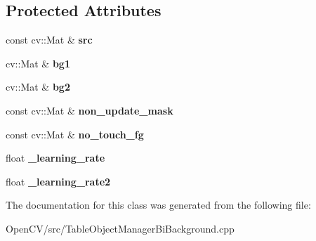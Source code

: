 \subsection*{Protected Attributes}
\begin{DoxyCompactItemize}
\item 
\hypertarget{classbg__update__parallel_ae1c3e97ab55c49abeeb39e6db59e9c85}{}\label{classbg__update__parallel_ae1c3e97ab55c49abeeb39e6db59e9c85} 
const cv\+::\+Mat \& {\bfseries src}
\item 
\hypertarget{classbg__update__parallel_af1160d47a07171184c8d0fe00b9e17b3}{}\label{classbg__update__parallel_af1160d47a07171184c8d0fe00b9e17b3} 
cv\+::\+Mat \& {\bfseries bg1}
\item 
\hypertarget{classbg__update__parallel_a595c319c1e73500138446fa658f1ea3e}{}\label{classbg__update__parallel_a595c319c1e73500138446fa658f1ea3e} 
cv\+::\+Mat \& {\bfseries bg2}
\item 
\hypertarget{classbg__update__parallel_a09df8634dd493bf9c2b6dc6d0e8059d5}{}\label{classbg__update__parallel_a09df8634dd493bf9c2b6dc6d0e8059d5} 
const cv\+::\+Mat \& {\bfseries non\+\_\+update\+\_\+mask}
\item 
\hypertarget{classbg__update__parallel_a87a1f23081a7686dfac2cf93d1f51dd4}{}\label{classbg__update__parallel_a87a1f23081a7686dfac2cf93d1f51dd4} 
const cv\+::\+Mat \& {\bfseries no\+\_\+touch\+\_\+fg}
\item 
\hypertarget{classbg__update__parallel_a476b5920c0c278c10c04672a152ca9a4}{}\label{classbg__update__parallel_a476b5920c0c278c10c04672a152ca9a4} 
float {\bfseries \+\_\+learning\+\_\+rate}
\item 
\hypertarget{classbg__update__parallel_a14e2818a8876a20b7036f2c1ffa908bf}{}\label{classbg__update__parallel_a14e2818a8876a20b7036f2c1ffa908bf} 
float {\bfseries \+\_\+learning\+\_\+rate2}
\end{DoxyCompactItemize}


The documentation for this class was generated from the following file\+:\begin{DoxyCompactItemize}
\item 
Open\+C\+V/src/Table\+Object\+Manager\+Bi\+Background.\+cpp\end{DoxyCompactItemize}
